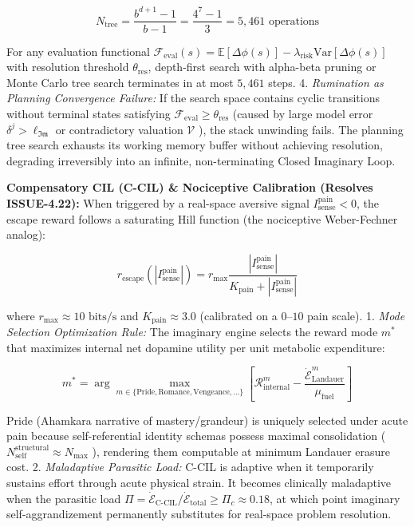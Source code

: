 \documentclass[11pt,a4paper]{article}
\theoremstyle{definition}
\theoremstyle{remark}
\begin{document}
\begin{equation}
N_{\text{tree}} = \frac{b^{d+1} - 1}{b - 1} = \frac{4^7 - 1}{3} = 5{,}461 \text{ operations}
\end{equation}


For any evaluation functional $\mathcal{F}_{\text{eval}}(s) = \mathbb{E}[\Delta\phi(s)] - \lambda_{\text{risk}}\text{Var}[\Delta\phi(s)]$ with resolution threshold $\theta_{\text{res}}$, depth-first search with alpha-beta pruning or Monte Carlo tree search terminates in at most $5{,}461$ steps.
4. \textit{Rumination as Planning Convergence Failure:} If the search space contains cyclic transitions without terminal states satisfying $\mathcal{F}_{\text{eval}} \ge \theta_{\text{res}}$ (caused by large model error $\delta^j > \ell_{\mathfrak{Im}}$ or contradictory valuation $\mathcal{V}$ ), the stack unwinding fails. The planning tree search exhausts its working memory buffer without achieving resolution, degrading irreversibly into an infinite, non-terminating Closed Imaginary Loop.

\textbf{Compensatory CIL (C-CIL) \& Nociceptive Calibration (Resolves ISSUE-4.22):}
When triggered by a real-space aversive signal $I_{\text{sense}}^{\text{pain}} < 0$, the escape reward follows a saturating Hill function (the nociceptive Weber-Fechner analog):


\begin{equation}
\boxed{r_{\text{escape}}\left(|I_{\text{sense}}^{\text{pain}}|\right) = r_{\max} \frac{|I_{\text{sense}}^{\text{pain}}|}{K_{\text{pain}} + |I_{\text{sense}}^{\text{pain}}|}}
\end{equation}


where $r_{\max} \approx 10\text{ bits/s}$ and $K_{\text{pain}} \approx 3.0$ (calibrated on a $0\text{--}10$ pain scale).
1. \textit{Mode Selection Optimization Rule:} The imaginary engine selects the reward mode $m^*$ that maximizes internal net dopamine utility per unit metabolic expenditure:


\begin{equation}
m^* = \arg\max_{m \in \{\text{Pride}, \text{Romance}, \text{Vengeance}, \dots\}} \left[ \mathcal{R}_{\text{internal}}^m - \frac{\dot{\mathcal{E}}_{\text{Landauer}}^m}{\mu_{\text{fuel}}} \right]
\end{equation}


Pride (Ahamkara narrative of mastery/grandeur) is uniquely selected under acute pain because self-referential identity schemas possess maximal consolidation ( $N_{\text{self}}^{\text{structural}} \approx N_{\max}$ ), rendering them computable at minimum Landauer erasure cost.
2. \textit{Maladaptive Parasitic Load:} C-CIL is adaptive when it temporarily sustains effort through acute physical strain. It becomes clinically maladaptive when the parasitic load $\Pi = \dot{\mathcal{E}}_{\text{C-CIL}} / \dot{\mathcal{E}}_{\text{total}} \ge \Pi_c \approx 0.18$, at which point imaginary self-aggrandizement permanently substitutes for real-space problem resolution.
\end{document}
